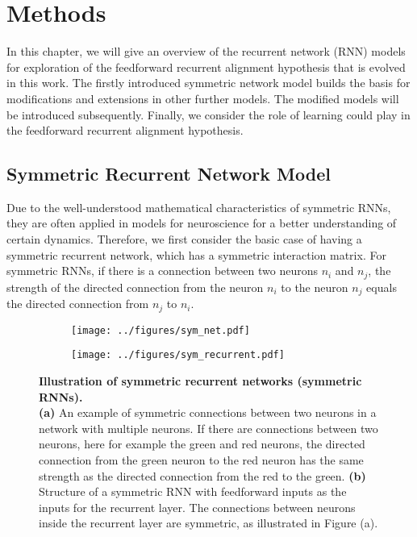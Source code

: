 \documentclass[11pt]{article}
\begin{document}
	
	\section{Methods}
	In this chapter, we will give an overview of the recurrent network (RNN) models for exploration of the feedforward recurrent alignment hypothesis that is evolved in this work. The firstly introduced symmetric network model builds the basis for modifications and extensions in other further models. The modified models will be introduced subsequently. Finally, we consider the role of learning could play in the feedforward recurrent alignment hypothesis. 
	
	\subsection{Symmetric Recurrent Network Model} \label{sec:ffrec_sym}
	Due to the well-understood mathematical characteristics of symmetric RNNs, they are often applied in models for neuroscience for a better understanding of certain dynamics.  
	Therefore, we first consider the basic case of having a symmetric recurrent network, which has a symmetric interaction matrix. For symmetric RNNs, if there is a connection between two neurons $n_i$ and $n_j$, the strength of the directed connection from the neuron $n_i$ to the neuron $n_j$ equals the directed connection from $n_j$ to $n_i$. 
		\begin{figure}[H] 
			\begin{subfigure}[b]{0.4\textwidth}
				\centering
				\texttt{[image: ../figures/sym\_net.pdf]}
				\vspace{0.2cm}
				\caption{}
			\end{subfigure}
			\hspace{0.4cm}
			\begin{subfigure}[b]{0.4\textwidth}
				\centering
				\texttt{[image: ../figures/sym\_recurrent.pdf]}
				\caption{}
			\end{subfigure}
		\caption[Illustration of symmetric recurrent networks (symmetric RNNs)]{\textbf{Illustration of symmetric recurrent networks (symmetric RNNs).} \\ \textbf{(a)} An example of symmetric connections between two neurons in a network with multiple neurons. If there are connections between two neurons, here for example the green and red neurons, the directed connection from the green neuron to the red neuron has the same strength as the directed connection from the red to the green. \textbf{(b)} Structure of a symmetric RNN with feedforward inputs as the inputs for the recurrent layer. The connections between neurons inside the recurrent layer are symmetric, as illustrated in Figure (a).}
		\label{fig:symmetric_RNN}
		\end{figure}
	
\end{document}
